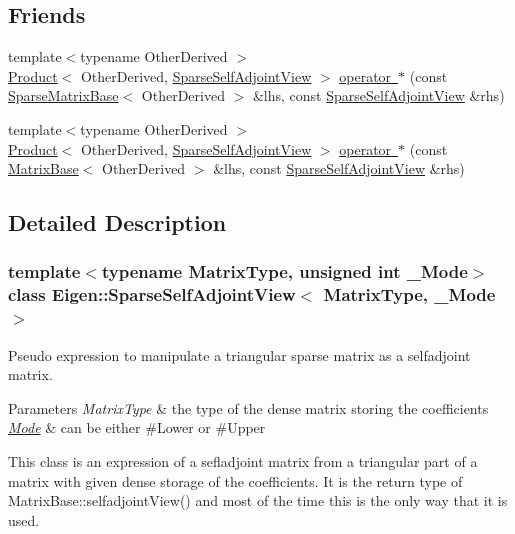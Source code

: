 \subsection*{Friends}
\begin{DoxyCompactItemize}
\item 
{\footnotesize template$<$typename Other\+Derived $>$ }\\\mbox{\hyperlink{class_eigen_1_1_product}{Product}}$<$ Other\+Derived, \mbox{\hyperlink{class_eigen_1_1_sparse_self_adjoint_view}{Sparse\+Self\+Adjoint\+View}} $>$ \mbox{\hyperlink{class_eigen_1_1_sparse_self_adjoint_view_a6bc1b528571ce9bbb4de2b6de5a589c7}{operator $\ast$}} (const \mbox{\hyperlink{class_eigen_1_1_sparse_matrix_base}{Sparse\+Matrix\+Base}}$<$ Other\+Derived $>$ \&lhs, const \mbox{\hyperlink{class_eigen_1_1_sparse_self_adjoint_view}{Sparse\+Self\+Adjoint\+View}} \&rhs)
\item 
{\footnotesize template$<$typename Other\+Derived $>$ }\\\mbox{\hyperlink{class_eigen_1_1_product}{Product}}$<$ Other\+Derived, \mbox{\hyperlink{class_eigen_1_1_sparse_self_adjoint_view}{Sparse\+Self\+Adjoint\+View}} $>$ \mbox{\hyperlink{class_eigen_1_1_sparse_self_adjoint_view_a041db67de7ff1e833befe8af97c49f7d}{operator $\ast$}} (const \mbox{\hyperlink{class_eigen_1_1_matrix_base}{Matrix\+Base}}$<$ Other\+Derived $>$ \&lhs, const \mbox{\hyperlink{class_eigen_1_1_sparse_self_adjoint_view}{Sparse\+Self\+Adjoint\+View}} \&rhs)
\end{DoxyCompactItemize}


\subsection{Detailed Description}
\subsubsection*{template$<$typename Matrix\+Type, unsigned int \+\_\+\+Mode$>$\newline
class Eigen\+::\+Sparse\+Self\+Adjoint\+View$<$ Matrix\+Type, \+\_\+\+Mode $>$}

Pseudo expression to manipulate a triangular sparse matrix as a selfadjoint matrix. 


\begin{DoxyParams}{Parameters}
{\em Matrix\+Type} & the type of the dense matrix storing the coefficients \\
\hline
{\em \mbox{\hyperlink{struct_mode}{Mode}}} & can be either {\ttfamily \#\+Lower} or {\ttfamily \#\+Upper} \\
\hline
\end{DoxyParams}
This class is an expression of a sefladjoint matrix from a triangular part of a matrix with given dense storage of the coefficients. It is the return type of Matrix\+Base\+::selfadjoint\+View() and most of the time this is the only way that it is used.


